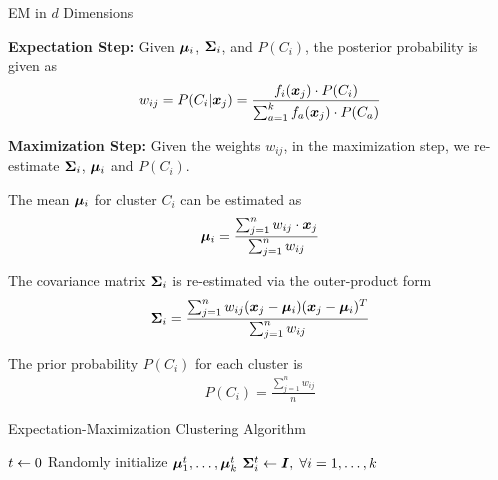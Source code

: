 \begin{frame}{EM in $d$ Dimensions}

{\bf Expectation Step:}
Given ${\bm \mu}_i$, ${\bm \Sigma}_i$, and $P(C_i)$, the posterior probability is
given as 
\begin{align*}
  w_{ij} = P(C_i | {\boldsymbol x}_{j}) 
 = \frac{f_i({\boldsymbol x}_{j}) \cdot P(C_{i})}
    {\sum_{a=1}^k f_a({\boldsymbol x}_{j}) \cdot P(C_{a})}
\end{align*}


\medskip
{\bf Maximization Step:}
Given the weights $w_{ij}$, in the maximization step, we
re-estimate ${\bm \Sigma}_i$, ${\bm \mu}_i$ and $P(C_i)$.

The mean ${\bm \mu}_i$ for cluster $C_i$ can be estimated as
\begin{align*}
    {\bm \mu}_i = \frac{\sum_{j=1}^n w_{ij} \cdot {\boldsymbol x}_{j}}
                {\sum_{j=1}^n w_{ij}}
\end{align*}

The covariance matrix ${\bm \Sigma}_i$ is re-estimated via the
outer-product form
\begin{align*}
  {\bm \Sigma}_i = \frac{\sum_{j=1}^n w_{ij}
                    ({\boldsymbol x}_{j}-{\bm \mu}_{i})({\boldsymbol x}_{j}-{\bm \mu}_{i})^T}
                    {\sum_{j=1}^n w_{ij}}
\end{align*}

The prior probability $P(C_i)$ for each cluster is 
\begin{align*}
    P(C_i) = \frac{\sum_{j=1}^n w_{ij}}{n}
\end{align*}
\end{frame}



\begin{frame}[fragile]{Expectation-Maximization Clustering Algorithm}
\begin{tightalgo}[H]{\textwidth-18pt}
\Algorithm{}
$t \leftarrow 0$\;
Randomly initialize ${\bm \mu}^t_1,\ldots,{\bm \mu}^t_k$\;
${\bm \Sigma}_i^t \leftarrow {\boldsymbol I},\;\forall i=1,\dots,k$\;
\end{tightalgo}
\end{frame}



